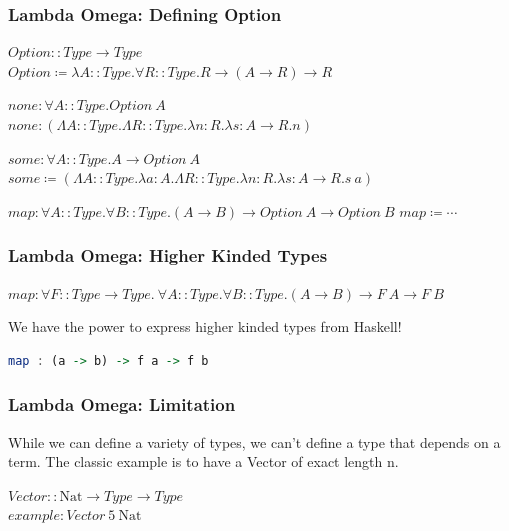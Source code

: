 \documentclass{beamer}
\newcommand{\nat}{\text{Nat}}
\begin{document}
\begin{frame}[fragile]
  \frametitle{Lambda Omega: Defining Option}

  $Option :: Type \rightarrow Type$ \\
  $Option \coloneqq \lambda A :: Type . \forall R :: Type . R \rightarrow (A \rightarrow R) \rightarrow R$ \\

  \vspace{5mm}

  $none : \forall A :: Type . Option\ A$ \\
  $none : (\Lambda A :: Type . \Lambda R :: Type . \lambda n : R . \lambda s : A \rightarrow R . n)$

  \vspace{5mm}

  $some : \forall A :: Type . A \rightarrow Option\ A$
  $some \coloneqq (\Lambda A :: Type . \lambda a:A . \Lambda R :: Type . \lambda n : R . \lambda s : A\rightarrow R . s\ a)$

  \vspace{5mm}

  $map : \forall A :: Type . \forall B :: Type . (A \rightarrow B) \rightarrow Option\ A \rightarrow Option\ B$
  $map \coloneqq \cdots $

\end{frame}

\begin{frame}[fragile]
  \frametitle{Lambda Omega: Higher Kinded Types}

  $map : \forall F :: Type \rightarrow Type . \ \forall A :: Type . \forall B :: Type . (A \rightarrow B) \rightarrow F\ A \rightarrow F\ B$

  \vspace{1cm}

  We have the power to express higher kinded types from Haskell!

  \begin{lstlisting}[language=haskell]
    map : (a -> b) -> f a -> f b
  \end{lstlisting}

\end{frame}

\begin{frame}[fragile]
  \frametitle{Lambda Omega: Limitation}

  While we can define a variety of types, we can't define a type that depends on a term.
  The classic example is to have a Vector of exact length n.

  \vspace{1cm}

  $Vector :: \nat \rightarrow Type \rightarrow Type $ \\
  $example: Vector\ 5\ \nat$

\end{frame}
\end{document}
